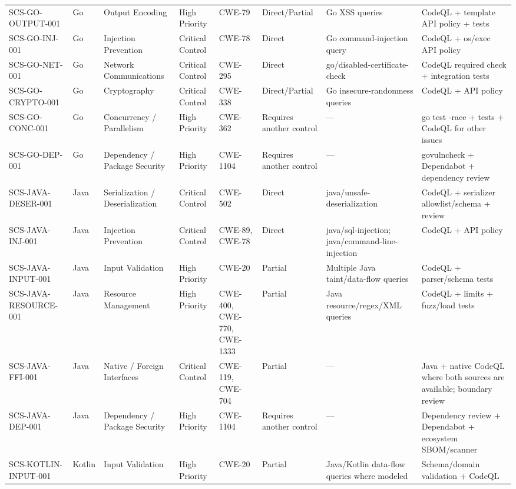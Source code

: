 \documentclass[10pt,letterpaper]{article}
\begin{document}
\begin{landscape}
\begin{longtable}{@{}P{1.0in}P{0.6in}P{0.95in}P{0.75in}P{0.85in}P{0.75in}P{2.0in}P{2.05in}@{}}
SCS-GO-OUTPUT-001 & Go & Output Encoding & High Priority & CWE-79 & Direct/Partial & Go XSS queries & CodeQL + template API policy + tests\\
SCS-GO-INJ-001 & Go & Injection Prevention & Critical Control & CWE-78 & Direct & Go command-injection query & CodeQL + os/exec API policy\\
SCS-GO-NET-001 & Go & Network Communications & Critical Control & CWE-295 & Direct & go/disabled-certificate-check & CodeQL required check + integration tests\\
SCS-GO-CRYPTO-001 & Go & Cryptography & Critical Control & CWE-338 & Direct/Partial & Go insecure-randomness queries & CodeQL + API policy\\
SCS-GO-CONC-001 & Go & Concurrency / Parallelism & High Priority & CWE-362 & Requires another control & --- & go test -race + tests + CodeQL for other issues\\
SCS-GO-DEP-001 & Go & Dependency / Package Security & High Priority & CWE-1104 & Requires another control & --- & govulncheck + Dependabot + dependency review\\
SCS-JAVA-DESER-001 & Java & Serialization / Deserialization & Critical Control & CWE-502 & Direct & java/unsafe-deserialization & CodeQL + serializer allowlist/schema + review\\
SCS-JAVA-INJ-001 & Java & Injection Prevention & Critical Control & CWE-89, CWE-78 & Direct & java/sql-injection; java/command-line-injection & CodeQL + API policy\\
SCS-JAVA-INPUT-001 & Java & Input Validation & High Priority & CWE-20 & Partial & Multiple Java taint/data-flow queries & CodeQL + parser/schema tests\\
SCS-JAVA-RESOURCE-001 & Java & Resource Management & High Priority & CWE-400, CWE-770, CWE-1333 & Partial & Java resource/regex/XML queries & CodeQL + limits + fuzz/load tests\\
SCS-JAVA-FFI-001 & Java & Native / Foreign Interfaces & Critical Control & CWE-119, CWE-704 & Partial & --- & Java + native CodeQL where both sources are available; boundary review\\
SCS-JAVA-DEP-001 & Java & Dependency / Package Security & High Priority & CWE-1104 & Requires another control & --- & Dependency review + Dependabot + ecosystem SBOM/scanner\\
SCS-KOTLIN-INPUT-001 & Kotlin & Input Validation & High Priority & CWE-20 & Partial & Java/Kotlin data-flow queries where modeled & Schema/domain validation + CodeQL\\

\end{longtable}
\end{landscape}
\end{document}
